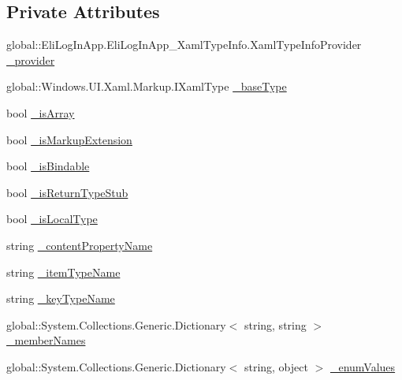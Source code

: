 \subsection*{Private Attributes}
\begin{DoxyCompactItemize}
\item 
global\+::\+Eli\+Log\+In\+App.\+Eli\+Log\+In\+App\+\_\+\+Xaml\+Type\+Info.\+Xaml\+Type\+Info\+Provider \hyperlink{class_eli_log_in_app_1_1_eli_log_in_app___xaml_type_info_1_1_xaml_user_type_acc3e5db316240d23dc71e1e0fdaab6db}{\+\_\+provider}
\item 
global\+::\+Windows.\+U\+I.\+Xaml.\+Markup.\+I\+Xaml\+Type \hyperlink{class_eli_log_in_app_1_1_eli_log_in_app___xaml_type_info_1_1_xaml_user_type_a509dcc8ca0e2440cdd2b07e2f7b27c4b}{\+\_\+base\+Type}
\item 
bool \hyperlink{class_eli_log_in_app_1_1_eli_log_in_app___xaml_type_info_1_1_xaml_user_type_a6723779a2ffc7dd10a109cc0beb0f5f6}{\+\_\+is\+Array}
\item 
bool \hyperlink{class_eli_log_in_app_1_1_eli_log_in_app___xaml_type_info_1_1_xaml_user_type_a34dd96169f6a7fdbc3442861b787ea72}{\+\_\+is\+Markup\+Extension}
\item 
bool \hyperlink{class_eli_log_in_app_1_1_eli_log_in_app___xaml_type_info_1_1_xaml_user_type_a09fa68394e067f7b19098942e42bd0e3}{\+\_\+is\+Bindable}
\item 
bool \hyperlink{class_eli_log_in_app_1_1_eli_log_in_app___xaml_type_info_1_1_xaml_user_type_a7d3f8c1e1517e2025169c0bccfef21bf}{\+\_\+is\+Return\+Type\+Stub}
\item 
bool \hyperlink{class_eli_log_in_app_1_1_eli_log_in_app___xaml_type_info_1_1_xaml_user_type_a56222f7dac60650eb12faf06f05e3cc3}{\+\_\+is\+Local\+Type}
\item 
string \hyperlink{class_eli_log_in_app_1_1_eli_log_in_app___xaml_type_info_1_1_xaml_user_type_ad2e252d3e689ff4e1d7eb6978a02e245}{\+\_\+content\+Property\+Name}
\item 
string \hyperlink{class_eli_log_in_app_1_1_eli_log_in_app___xaml_type_info_1_1_xaml_user_type_a6b2e6c3f270d8ca1d3c80db99816bd1f}{\+\_\+item\+Type\+Name}
\item 
string \hyperlink{class_eli_log_in_app_1_1_eli_log_in_app___xaml_type_info_1_1_xaml_user_type_add7c913c4ec28d4049c6132e8ef2ac90}{\+\_\+key\+Type\+Name}
\item 
global\+::\+System.\+Collections.\+Generic.\+Dictionary$<$ string, string $>$ \hyperlink{class_eli_log_in_app_1_1_eli_log_in_app___xaml_type_info_1_1_xaml_user_type_a1903a2a3241826e4a8d2deccc45723c5}{\+\_\+member\+Names}
\item 
global\+::\+System.\+Collections.\+Generic.\+Dictionary$<$ string, object $>$ \hyperlink{class_eli_log_in_app_1_1_eli_log_in_app___xaml_type_info_1_1_xaml_user_type_a7637f1b9ec4302698adad5ef29e756e6}{\+\_\+enum\+Values}
\end{DoxyCompactItemize}


